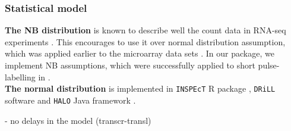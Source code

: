 \subsubsection*{Statistical model}
\textbf{The NB distribution} is known to describe well the count data in RNA-seq 
experiments \citep{robinson2007moderated}. This encourages to use it over 
normal distribution assumption, which was applied earlier to the microarray data sets
\citep{miller2011dynamic}. In our package, we implement NB assumptions, which were
successfully applied to short pulse-labelling in \citep{eser2016determinants,
schwalb2016tt}.\\
\textbf{The normal distribution} is implemented in \verb|INSPEcT| R package \citep{de2015inspect},
\verb|DRiLL| software \citep{rabani2014high} and \verb|HALO| Java framework \citep{friedel2010halo}.





- no delays in the model (transcr-transl)					